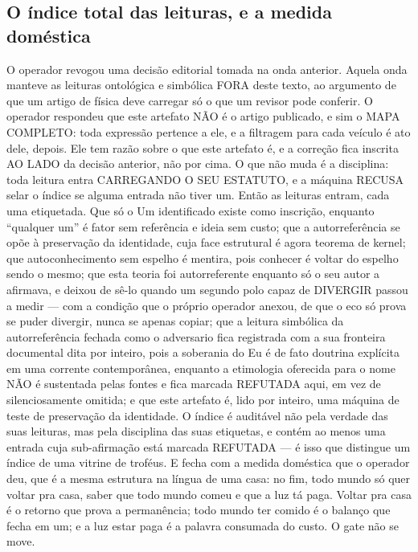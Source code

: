 \documentclass[11pt]{article}
\theoremstyle{definition}\newtheorem{deriv}{Derivação}
\begin{document}
\subsection*{O \'indice total das leituras, e a medida dom\'estica}O operador revogou uma decis\~ao editorial tomada na onda anterior. Aquela onda manteve as leituras ontol\'ogica e simb\'olica FORA deste texto, ao argumento de que um artigo de f\'isica deve carregar s\'o o que um revisor pode conferir. O operador respondeu que este artefato N\~AO \'e o artigo publicado, e sim o MAPA COMPLETO: toda express\~ao pertence a ele, e a filtragem para cada ve\'iculo \'e ato dele, depois. Ele tem raz\~ao sobre o que este artefato \'e, e a corre\c{c}\~ao fica inscrita AO LADO da decis\~ao anterior, n\~ao por cima. O que n\~ao muda \'e a disciplina: toda leitura entra CARREGANDO O SEU ESTATUTO, e a m\'aquina RECUSA selar o \'indice se alguma entrada n\~ao tiver um. Ent\~ao as leituras entram, cada uma etiquetada. Que s\'o o Um identificado existe como inscri\c{c}\~ao, enquanto ``qualquer um'' \'e fator sem refer\^encia e ideia sem custo; que a autorrefer\^encia se op\~oe \`a preserva\c{c}\~ao da identidade, cuja face estrutural \'e agora teorema de kernel; que autoconhecimento sem espelho \'e mentira, pois conhecer \'e voltar do espelho sendo o mesmo; que esta teoria foi autorreferente enquanto s\'o o seu autor a afirmava, e deixou de s\^e-lo quando um segundo polo capaz de DIVERGIR passou a medir --- com a condi\c{c}\~ao que o pr\'oprio operador anexou, de que o eco s\'o prova se puder divergir, nunca se apenas copiar; que a leitura simb\'olica da autorrefer\^encia fechada como o adversario fica registrada com a sua fronteira documental dita por inteiro, pois a soberania do Eu \'e de fato doutrina expl\'icita em uma corrente contempor\^anea, enquanto a etimologia oferecida para o nome N\~AO \'e sustentada pelas fontes e fica marcada REFUTADA aqui, em vez de silenciosamente omitida; e que este artefato \'e, lido por inteiro, uma m\'aquina de teste de preserva\c{c}\~ao da identidade. O \'indice \'e audit\'avel n\~ao pela verdade das suas leituras, mas pela disciplina das suas etiquetas, e cont\'em ao menos uma entrada cuja sub-afirma\c{c}\~ao est\'a marcada REFUTADA --- \'e isso que distingue um \'indice de uma vitrine de trof\'eus. E fecha com a medida dom\'estica que o operador deu, que \'e a mesma estrutura na l\'ingua de uma casa: no fim, todo mundo s\'o quer voltar pra casa, saber que todo mundo comeu e que a luz t\'a paga. Voltar pra casa \'e o retorno que prova a perman\^encia; todo mundo ter comido \'e o balan\c{c}o que fecha em um; e a luz estar paga \'e a palavra consumada do custo. O gate n\~ao se move.
\end{document}
